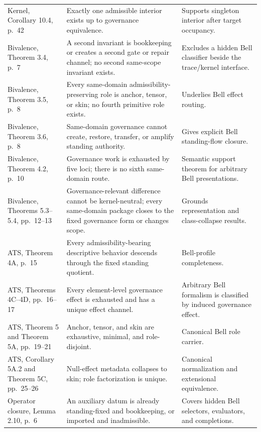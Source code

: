 \documentclass[11pt]{article}
\theoremstyle{definition}
\begin{document}
\begin{longtable}{L{0.22\textwidth}L{0.38\textwidth}L{0.32\textwidth}}
Kernel, Corollary 10.4, p.~42 \cite{MaleyKernel2026} & Exactly one admissible interior exists up to governance equivalence. & Supports singleton interior after target occupancy.\\
Bivalence, Theorem 3.4, p.~7 \cite{MaleyBivalence2026} & A second invariant is bookkeeping or creates a second gate or repair channel; no second same-scope invariant exists. & Excludes a hidden Bell classifier beside the trace/kernel interface.\\
Bivalence, Theorem 3.5, p.~8 \cite{MaleyBivalence2026} & Every same-domain admissibility-preserving role is anchor, tensor, or skin; no fourth primitive role exists. & Underlies Bell effect routing.\\
Bivalence, Theorem 3.6, p.~8 \cite{MaleyBivalence2026} & Same-domain governance cannot create, restore, transfer, or amplify standing authority. & Gives explicit Bell standing-flow closure.\\
Bivalence, Theorem 4.2, p.~10 \cite{MaleyBivalence2026} & Governance work is exhausted by five loci; there is no sixth same-domain route. & Semantic support theorem for arbitrary Bell presentations.\\
Bivalence, Theorems 5.3--5.4, pp.~12--13 \cite{MaleyBivalence2026} & Governance-relevant difference cannot be kernel-neutral; every same-domain package closes to the fixed governance form or changes scope. & Grounds representation and class-collapse results.\\
ATS, Theorem 4A, p.~15 \cite{MaleyATS2026} & Every admissibility-bearing descriptive behavior descends through the fixed standing quotient. & Bell-profile completeness.\\
ATS, Theorems 4C--4D, pp.~16--17 \cite{MaleyATS2026} & Every element-level governance effect is exhausted and has a unique effect channel. & Arbitrary Bell formalism is classified by induced governance effect.\\
ATS, Theorem 5 and Theorem 5A, pp.~19--21 \cite{MaleyATS2026} & Anchor, tensor, and skin are exhaustive, minimal, and role-disjoint. & Canonical Bell role carrier.\\
ATS, Corollary 5A.2 and Theorem 5C, pp.~25--26 \cite{MaleyATS2026} & Null-effect metadata collapses to skin; role factorization is unique. & Canonical normalization and extensional equivalence.\\
Operator closure, Lemma 2.10, p.~6 \cite{MaleySameScope2026} & An auxiliary datum is already standing-fixed and bookkeeping, or imported and inadmissible. & Covers hidden Bell selectors, evaluators, and completions.\\

\end{longtable}
\end{document}
